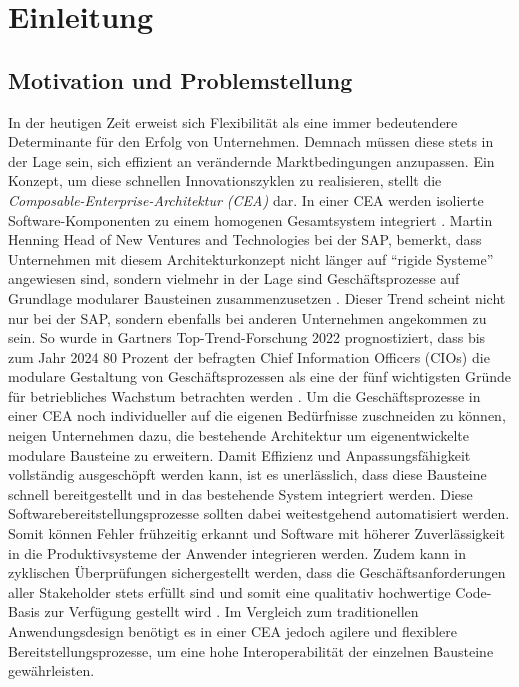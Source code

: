 \section{Einleitung}

\subsection{Motivation und Problemstellung}
In der heutigen Zeit erweist sich Flexibilität als eine immer bedeutendere Determinante für den Erfolg von Unternehmen. Demnach müssen diese stets in der Lage sein, sich effizient an verändernde Marktbedingungen anzupassen. Ein Konzept, um diese schnellen Innovationszyklen zu realisieren, stellt die \textit{Composable-Enterprise-Architektur (CEA)} dar. In einer CEA werden isolierte Software-Komponenten zu einem homogenen Gesamtsystem integriert \cite{.20230313}. Martin Henning Head of New Ventures and Technologies bei der SAP, bemerkt, dass Unternehmen mit diesem Architekturkonzept nicht länger auf \enquote{rigide Systeme} angewiesen sind, sondern vielmehr in der Lage sind Geschäftsprozesse auf Grundlage modularer Bausteinen zusammenzusetzen \cite{Galer.20221019}. Dieser Trend scheint nicht nur bei der SAP, sondern ebenfalls bei anderen Unternehmen angekommen zu sein. So wurde in Gartners Top-Trend-Forschung 2022 prognostiziert, dass bis zum Jahr 2024 80 Prozent der befragten Chief Information Officers (\acs{CIO}s) die modulare Gestaltung von Geschäftsprozessen als eine der fünf wichtigsten Gründe für betriebliches Wachstum betrachten werden \cite{Gartner.20230408}. Um die Geschäftsprozesse in einer CEA noch individueller auf die eigenen Bedürfnisse zuschneiden zu können, neigen Unternehmen dazu, die bestehende Architektur um eigenentwickelte modulare Bausteine zu erweitern. Damit Effizienz und Anpassungsfähigkeit vollständig ausgeschöpft werden kann, ist es unerlässlich, dass diese Bausteine schnell bereitgestellt und in das bestehende System integriert werden. Diese  Softwarebereitstellungsprozesse sollten dabei weitestgehend automatisiert werden. Somit können Fehler frühzeitig erkannt und Software mit höherer Zuverlässigkeit in die Produktivsysteme der Anwender integrieren werden. Zudem kann in zyklischen Überprüfungen sichergestellt werden, dass die Geschäftsanforderungen aller Stakeholder stets erfüllt sind und somit eine qualitativ hochwertige Code-Basis zur Verfügung gestellt wird \cite[471]{Zampetti.92720211012021}. Im Vergleich zum traditionellen Anwendungsdesign benötigt es in einer CEA jedoch agilere und flexiblere Bereitstellungsprozesse, um eine hohe Interoperabilität der einzelnen Bausteine gewährleisten.





